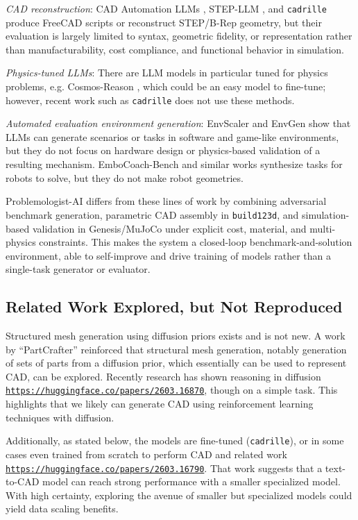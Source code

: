 \documentclass[conference]{IEEEtran}
\begin{document}
\textit{CAD reconstruction}: CAD Automation LLMs \cite{ref31}, STEP-LLM \cite{ref32}, and \texttt{cadrille} \cite{ref39} produce FreeCAD scripts or reconstruct STEP/B-Rep geometry, but their evaluation is largely limited to syntax, geometric fidelity, or representation rather than manufacturability, cost compliance, and functional behavior in simulation.

\textit{Physics-tuned LLMs}: There are LLM models in particular tuned for physics problems, e.g. Cosmos-Reason \cite{ref33}, which could be an easy model to fine-tune; however, recent work such as \texttt{cadrille} does not use these methods.

\textit{Automated evaluation environment generation}: EnvScaler \cite{ref29} and EnvGen \cite{ref30} show that LLMs can generate scenarios or tasks in software and game-like environments, but they do not focus on hardware design or physics-based validation of a resulting mechanism. EmboCoach-Bench \cite{ref28} and similar works synthesize tasks for robots to solve, but they do not make robot geometries.

Problemologist-AI differs from these lines of work by combining adversarial benchmark generation, parametric CAD assembly in \texttt{build123d}, and simulation-based validation in Genesis/MuJoCo under explicit cost, material, and multi-physics constraints. This makes the system a closed-loop benchmark-and-solution environment, able to self-improve and drive training of models rather than a single-task generator or evaluator.

\subsection{Related Work Explored, but Not Reproduced}
Structured mesh generation using diffusion priors exists and is not new. A work by ``PartCrafter'' reinforced that structural mesh generation, notably generation of sets of parts from a diffusion prior, which essentially can be used to represent CAD, can be explored. Recently research has shown reasoning in diffusion \href{https://huggingface.co/papers/2603.16870}{\nolinkurl{https://huggingface.co/papers/2603.16870}}, though on a simple task. This highlights that we likely can generate CAD using reinforcement learning techniques with diffusion.

Additionally, as stated below, the models are fine-tuned (\texttt{cadrille}), or in some cases even trained from scratch to perform CAD and related work \href{https://huggingface.co/papers/2603.16790}{\nolinkurl{https://huggingface.co/papers/2603.16790}}. That work suggests that a text-to-CAD model can reach strong performance with a smaller specialized model. With high certainty, exploring the avenue of smaller but specialized models could yield data scaling benefits.
\end{document}
